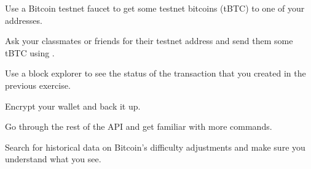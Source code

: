 \begin{exercise}
Use a Bitcoin testnet faucet to get some testnet bitcoins (tBTC) to one of your addresses.
\end{exercise}

\begin{exercise}
Ask your classmates or friends for their testnet address and send them some tBTC using .
\end{exercise}

\begin{exercise}
Use a block explorer to see the status of the transaction that you created in the previous exercise.
\end{exercise}

\begin{exercise}
Encrypt your wallet and back it up.
\end{exercise}

\begin{exercise}
Go through the rest of the API and get familiar with more commands.
\end{exercise}

\begin{exercise}
Search for historical data on Bitcoin's difficulty adjustments and make sure you understand what you see.
\end{exercise}


